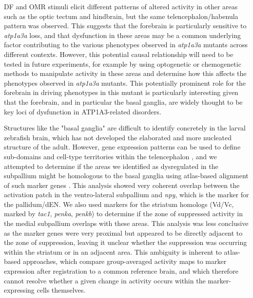 \documentclass[9.5pt,lineno]{RandlettLab_elife}
\begin{document}
DF and OMR stimuli elicit different patterns of altered activity in other areas such as the optic tectum and hindbrain, but the same telencephalon/habenula pattern was observed.
This suggests that the forebrain is particularly sensitive to \emph{atp1a3a} loss, and that dysfunction in these areas may be a common underlying factor contributing to the various phenotypes observed in \emph{atp1a3a} mutants across different contexts. 
However, this potential causal relationship will need to be tested in future experiments, for example by using optogenetic or chemogenetic methods to manipulate activity in these areas and determine how this affects the phenotypes observed in \emph{atp1a3a} mutants.
This potentially prominent role for the forebrain in driving phenotypes in this mutant is particularly interesting given that the forebrain, and in particular the basal ganglia, are widely thought to be key loci of dysfunction in ATP1A3-related disorders.  

Structures like the "basal ganglia" are difficult to identify concretely in the larval zebrafish brain, which has not developed the elaborated and more nucleated structure of the adult. However, gene expression patterns can be used to define sub-domains and cell-type territories within the telencephalon \citep{Pandey2023_GR}, and we attempted to determine if the areas we identified as dysregulated in the subpallium might be homologous to the basal ganglia using atlas-based alignment of such marker genes \citep{Tanimoto2024}. This analysis showed very coherent overlap between the activation patch in the ventro-lateral subpallium and \emph{npy}, which is the marker for the pallidum/dEN. We also used markers for the striatum homologs (Vd/Vc, marked by \emph{tac1}, \emph{penka}, \emph{penkb}) to determine if the zone of suppressed activity in the medial subpallium overlaps with these areas. This analysis was less conclusive as the marker genes were very proximal but appeared to be directly adjacent to the zone of suppression, leaving it unclear whether the suppression was occurring within the striatum or in an adjacent area.
This ambiguity is inherent to atlas-based approaches, which compare group-averaged activity maps to marker expression after registration to a common reference brain, and which therefore cannot resolve whether a given change in activity occurs within the marker-expressing cells themselves.
\end{document}
